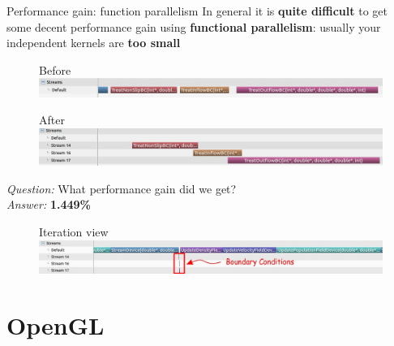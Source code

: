 \documentclass[9pt]{beamer}
\begin{document}
\begin{frame}[t]{Performance gain: function parallelism}
In general it is \textbf{quite difficult} to get some decent performance gain using \textbf{functional parallelism}: usually your independent kernels are \textbf{too small}
\begin{figure}
	Before\\
	\includegraphics[scale=0.25]{images/streams-1.jpg}
	\centering
\end{figure}

\begin{figure}
	After\\
	\includegraphics[scale=0.25]{images/streams-2.jpg}
	\centering
\end{figure}

\textit{Question:} What performance gain did we get?\\
\textit{Answer:} \textbf{1.449\%}

\begin{figure}
	Iteration view
	\includegraphics[scale=0.25]{images/streams-4.jpg}
	\centering
\end{figure}
\end{frame}


\section{OpenGL}
\end{document}
